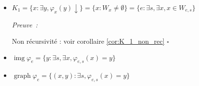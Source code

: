\documentclass{book}
\theoremstyle{definition}
\numberwithin{lemma}{subsection}
\numberwithin{theorem}{subsection}
\numberwithin{definition}{subsection}
\numberwithin{proposition}{subsection}
\numberwithin{corollary}{subsection}
\numberwithin{property}{subsection}
\numberwithin{example}{subsection}
\numberwithin{heuristique}{subsection}
\numberwithin{scenario}{subsection}
\newenvironment{proofi} {\noindent\emph{Preuve~:}} {\hfill $\square$\vspace{0.2cm}}
\newcommand{\GodelFunc}[1]{\varphi_{#1}}
\newcommand{\Pairing}[1]{\langle #1 \rangle}
\DeclareMathOperator{\dom}{dom}
\DeclareMathOperator{\img}{img}
\DeclareMathOperator{\graph}{graph}
\begin{document}
\begin{itemize}
                    \par \begin{proofi}
                        \begin{itemize}
                        \item Récursivement énumérable : $K_0 = \dom \theta $ où $ \theta(\Pairing{x,y}) = \GodelFunc{z}(y,x) = \GodelFunc{y}(x)$ (voir th. \ref{th:enum}).
                        \item Non récursif : voir corollaire \ref{cor:K0_non_rec}.
                        \end{itemize}
                        \vspace{-\baselineskip}
                        \vspace{-\baselineskip}
                    \end{proofi}
                    
                \item $K_1 = \{x:\exists y, \GodelFunc{x}(y)\downarrow\} = \{x:W_x \not= \emptyset\} = \{e : \exists s, \exists x, x \in W_{e,s}\}$
                    \par\begin{proofi}
                        \par Non récursivité : voir corollaire \ref{cor:K_1_non_rec}
                    \end{proofi}
                \item $\img \GodelFunc{e} = \{y : \exists s, \exists x, \GodelFunc{e,s}(x) = y\}$
                \item $\graph \GodelFunc{e} = \{(x,y) : \exists s, \GodelFunc{e,s}(x) = y\}$
            \end{itemize}
            
\end{document}

